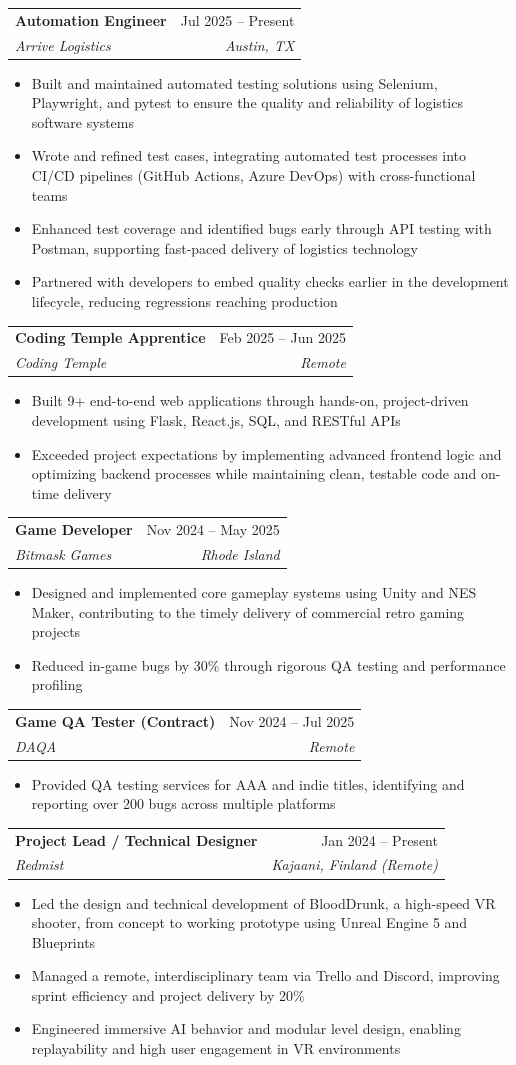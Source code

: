 \documentclass[letterpaper,10.5pt]{article}
\makeatletter
\newcommand{\resumeItem}[1]{
  \item\small{
    {#1 \vspace{-2pt}}
  }
}
\newcommand{\resumeSubheading}[4]{
  \vspace{-2pt}\item
    \begin{tabular*}{0.97\textwidth}[t]{l@{\extracolsep{\fill}}r}
      \textbf{#1} & #2 \\
      \textit{\small#3} & \textit{\small #4} \\
    \end{tabular*}\vspace{-0.5pt}
}
\newcommand{\resumeItemListStart}{\begin{itemize}}
\newcommand{\resumeItemListEnd}{\end{itemize}\vspace{-2pt}}
\makeatother
\begin{document}
    \resumeSubheading
      {Automation Engineer}{Jul 2025 -- Present}
      {Arrive Logistics}{Austin, TX}
      \resumeItemListStart
        \resumeItem{Built and maintained automated testing solutions using Selenium, Playwright, and pytest to ensure the quality and reliability of logistics software systems}
        \resumeItem{Wrote and refined test cases, integrating automated test processes into CI/CD pipelines (GitHub Actions, Azure DevOps) with cross-functional teams}
        \resumeItem{Enhanced test coverage and identified bugs early through API testing with Postman, supporting fast-paced delivery of logistics technology}
        \resumeItem{Partnered with developers to embed quality checks earlier in the development lifecycle, reducing regressions reaching production}
      \resumeItemListEnd

    \resumeSubheading
      {Coding Temple Apprentice}{Feb 2025 -- Jun 2025}
      {Coding Temple}{Remote}
      \resumeItemListStart
        \resumeItem{Built 9+ end-to-end web applications through hands-on, project-driven development using Flask, React.js, SQL, and RESTful APIs}
        \resumeItem{Exceeded project expectations by implementing advanced frontend logic and optimizing backend processes while maintaining clean, testable code and on-time delivery}
      \resumeItemListEnd

    \resumeSubheading
      {Game Developer}{Nov 2024 -- May 2025}
      {Bitmask Games}{Rhode Island}
      \resumeItemListStart
        \resumeItem{Designed and implemented core gameplay systems using Unity and NES Maker, contributing to the timely delivery of commercial retro gaming projects}
        \resumeItem{Reduced in-game bugs by 30\% through rigorous QA testing and performance profiling}
      \resumeItemListEnd

    \resumeSubheading
      {Game QA Tester (Contract)}{Nov 2024 -- Jul 2025}
      {DAQA}{Remote}
      \resumeItemListStart
        \resumeItem{Provided QA testing services for AAA and indie titles, identifying and reporting over 200 bugs across multiple platforms}
      \resumeItemListEnd

    \resumeSubheading
      {Project Lead / Technical Designer}{Jan 2024 -- Present}
      {Redmist}{Kajaani, Finland (Remote)}
      \resumeItemListStart
        \resumeItem{Led the design and technical development of BloodDrunk, a high-speed VR shooter, from concept to working prototype using Unreal Engine 5 and Blueprints}
        \resumeItem{Managed a remote, interdisciplinary team via Trello and Discord, improving sprint efficiency and project delivery by 20\%}
        \resumeItem{Engineered immersive AI behavior and modular level design, enabling replayability and high user engagement in VR environments}
      \resumeItemListEnd
\end{document}
